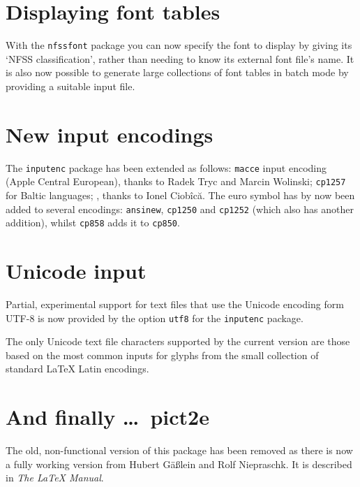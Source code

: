 \documentclass{ltnews}
\providecommand\pkg[1]{\texttt{#1}}
\providecommand\option[1]{\texttt{#1}}
\begin{document}
\section{Displaying font tables}

With the \pkg{nfssfont} package you can now
specify the font to display by giving its `NFSS classification',
rather than needing to know its external font file's name.
It is also now possible to generate large collections of font
tables in batch mode by providing a suitable input file.


\section{New input encodings}

The \pkg{inputenc} package has been extended as follows:
\option{macce} input encoding
(Apple Central European),
thanks to Radek Tryc and Marcin Wolinski; \option{cp1257}\newline
for Baltic languages; ,
thanks to Ionel Ciob\^{i}c\u{a}.\newline
The euro symbol has by
now been added to several encodings:
\option{ansinew}, \option{cp1250}
and \option{cp1252} (which also\newline
has another addition), whilst \option{cp858}
adds it to \option{cp850}.


\section{Unicode input}

Partial, experimental support for text files that use the Unicode
encoding form UTF-8 is now provided by the option \option{utf8} for
the \pkg{inputenc} package.

The only Unicode text file characters supported by the current version
are those based on the most common inputs for glyphs from the small
collection\newline
of standard \LaTeX{} Latin encodings.


\section{And finally \ldots\ pict2e}

The old, non-functional version of this package has been removed
 as there is now a fully working version from Hubert G\"a{\ss}lein
 and Rolf Niepraschk.  It is described
 in \textit{The \LaTeX{} Manual}.
\end{document}
